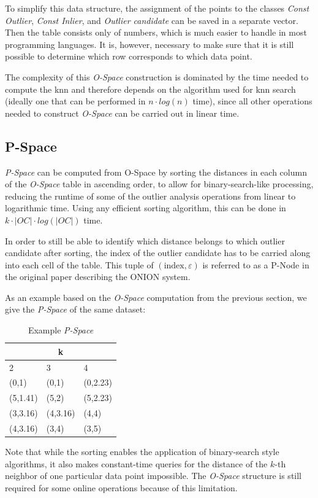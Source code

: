 \documentclass[runningheads]{llncs}
\begin{document}
To simplify this data structure, the assignment of the points to the classes \emph{Const Outlier}, \emph{Const Inlier}, and \emph{Outlier candidate} can be saved in a separate vector. Then the table consists only of numbers, which is much easier to handle in most programming languages. It is, however, necessary to make sure that it is still possible to determine which row corresponds to which data point. 

The complexity of this \emph{O-Space} construction is dominated by the time needed to compute the knn and therefore depends on the algorithm used for knn search (ideally one that can be performed in $n \cdot log(n)$ time), since all other operations needed to construct \emph{O-Space} can be carried out in linear time.
\subsection{P-Space}
\emph{P-Space} can be computed from O-Space by sorting the distances in each column of the \emph{O-Space} table in ascending order, to allow for binary-search-like processing, reducing the runtime of some of the outlier analysis operations from linear to logarithmic time. Using any efficient sorting algorithm, this can be done in $k \cdot |OC| \cdot log(|OC|)$ time. 

In order to still be able to identify which distance belongs to which outlier candidate after sorting, the index of the outlier candidate has to be carried along into each cell of the table. This tuple of $(\text{index},\varepsilon)$ is referred to as a P-Node in the original paper \cite{onion} describing the ONION system.

As an example based on the \emph{O-Space} computation from the previous section, we give the \emph{P-Space} of the same dataset:
\begin{table}
\centering
\caption{Example \emph{P-Space}}
\begin{tabular} {| l | l | l |}
\hline
\multicolumn{3}{|c|}{k}\\
\hline
2 & 3 & 4\\
\hline
(0,1) & (0,1) & (0,2.23) \\
(5,1.41) & (5,2) & (5,2.23)\\
(3,3.16) & (4,3.16)  & (4,4)  \\
(4,3.16) & (3,4)  & (3,5)\\
\hline
\end{tabular}
\end{table}

Note that while the sorting enables the application of binary-search style algorithms, it also makes constant-time queries for the distance of the $k$-th neighbor of one particular data point impossible. The \emph{O-Space} structure is still required for some online operations because of this limitation.
\end{document}

